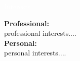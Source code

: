 \LARGE
\noindent\colorbox{materialYellow}
{\parbox[c][25pt][c]{\textwidth}{\hspace{15pt}\textcolor{white}{Interests}}} %

\large
\vspace*{10pt}

\textcolor{materialYellow}{\textbf{Profes}}\textcolor{textGray}{\textbf{sional:}}\\
{\normalsize\hspace*{12pt}
professional interests....%
}\\

\textcolor{materialYellow}{\textbf{Pers}}\textcolor{textGray}{\textbf{onal:}}\\
{\normalsize\hspace*{12pt}
personal interests....%
}

\vspace*{10pt}